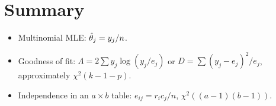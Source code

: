 \section*{Summary}
\begin{itemize}
  \item Multinomial MLE: $\hat{\theta}_j = y_j/n$.
  \item Goodness of fit: $\Lambda = 2\sum y_j\log(y_j/e_j)$ or $D = \sum(y_j-e_j)^2/e_j$,
        approximately $\chi^2(k-1-p)$.
  \item Independence in an $a\times b$ table: $e_{ij} = r_ic_j/n$, $\chi^2((a-1)(b-1))$.
\end{itemize}

